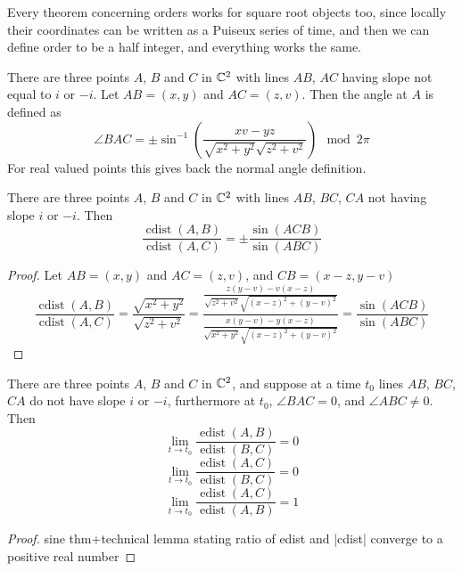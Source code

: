 \documentclass[a4paper]{article}
\newcommand{\cdist}{\operatorname{cdist}}
\newcommand{\edist}{\operatorname{edist}}
\begin{document}
\begin{remark}
    Every theorem concerning orders works for square root objects too, since locally their coordinates can be written as a Puiseux series of time, and then we can define order to be a half integer, and everything works the same.
\end{remark}


\begin{definition}
    There are three points $A$, $B$ and $C$ in $\mathbb{C}^2$ with lines $AB$, $AC$ having slope not equal to $i$ or $-i$. Let $AB=(x,y)$ and $AC=(z,v)$. Then the angle at $A$ is defined as
    $$\angle BAC=\pm \sin^{-1}\left(\frac{xv-yz}{\sqrt{x^2+y^2}\sqrt{z^2+v^2}}\right) \mod 2\pi$$
    For real valued points this gives back the normal angle definition.
\end{definition}

\begin{lemma}
    There are three points $A$, $B$ and $C$ in $\mathbb{C}^2$ with lines $AB$, $BC$, $CA$ not having slope $i$ or $-i$. Then
    $$\frac{\cdist(A,B)}{\cdist(A,C)}=\pm\frac{\sin(ACB)}{\sin(ABC)}$$
\end{lemma}
\begin{proof}
    Let $AB=(x,y)$ and $AC=(z,v)$, and $CB=(x-z,y-v)$
    $$\frac{\cdist(A,B)}{\cdist(A,C)}=\frac{\sqrt{x^2+y^2}}{\sqrt{z^2+v^2}}=\frac{\frac{z(y-v)-v(x-z)}{\sqrt{z^2+v^2}\sqrt{(x-z)^2+(y-v)^2}}}{\frac{x(y-v)-y(x-z)}{\sqrt{x^2+y^2}\sqrt{(x-z)^2+(y-v)^2}}}=\frac{\sin(ACB)}{\sin(ABC)}$$
\end{proof}

\begin{lemma}
    There are three points $A$, $B$ and $C$ in $\mathbb{C}^2$, and suppose at a time $t_0$ lines $AB$, $BC$, $CA$ do not have slope $i$ or $-i$, furthermore at $t_0$, $\angle BAC=0$, and $\angle ABC\ne 0$. Then
    $$\lim_{t\to t_0}\frac{\edist(A,B)}{\edist(B,C)}=0$$
    $$\lim_{t\to t_0}\frac{\edist(A,C)}{\edist(B,C)}=0$$
    $$\lim_{t\to t_0}\frac{\edist(A,C)}{\edist(A,B)}=1$$
\end{lemma}
\begin{proof}
    sine thm+technical lemma stating ratio of edist and |cdist| converge to a positive real number
\end{proof}
\end{document}
